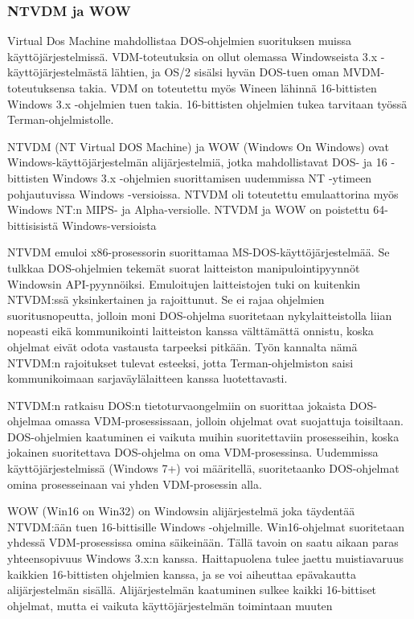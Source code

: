 \subsubsection{NTVDM ja WOW}
Virtual Dos Machine mahdollistaa DOS-ohjelmien suorituksen muissa käyttöjärjestelmissä. VDM-toteutuksia on ollut olemassa Windowseista 3.x -käyttöjärjestelmästä lähtien, ja OS/2 sisälsi hyvän DOS-tuen oman MVDM-toteutuksensa takia. VDM on toteutettu myös Wineen lähinnä 16-bittisten Windows 3.x -ohjelmien tuen takia. 16-bittisten ohjelmien tukea tarvitaan työssä Terman-ohjelmistolle.

NTVDM (NT Virtual DOS Machine) ja WOW (Windows On Windows) ovat Windows-käyttöjärjestelmän alijärjestelmiä, jotka mahdollistavat DOS- ja 16 -bittisten Windows 3.x -ohjelmien suorittamisen uudemmissa NT -ytimeen pohjautuvissa Windows -versioissa. NTVDM oli toteutettu emulaattorina myös Windows NT:n MIPS- ja Alpha-versiolle. NTVDM ja WOW on poistettu 64-bittisisistä Windows-versioista \citep{ntvdm_2}

NTVDM emuloi x86-prosessorin suorittamaa MS-DOS-käyttöjärjestelmää. Se tulkkaa DOS-ohjelmien tekemät suorat laitteiston manipulointipyynnöt Windowsin API-pyynnöiksi. Emuloitujen laitteistojen tuki on kuitenkin NTVDM:ssä yksinkertainen ja rajoittunut. Se ei rajaa ohjelmien suoritusnopeutta, jolloin moni DOS-ohjelma suoritetaan nykylaitteistolla liian nopeasti eikä kommunikointi laitteiston kanssa välttämättä onnistu, koska ohjelmat eivät odota vastausta tarpeeksi pitkään. Työn kannalta nämä NTVDM:n rajoitukset tulevat esteeksi, jotta Terman-ohjelmiston saisi kommunikoimaan sarjaväylälaitteen kanssa luotettavasti.

NTVDM:n ratkaisu DOS:n tietoturvaongelmiin on suorittaa jokaista DOS-ohjelmaa omassa VDM-prosessissaan, jolloin ohjelmat ovat suojattuja toisiltaan. DOS-ohjelmien kaatuminen ei vaikuta muihin suoritettaviin prosesseihin, koska jokainen suoritettava DOS-ohjelma on oma VDM-prosessinsa. Uudemmissa käyttöjärjestelmissä (Windows 7+) voi määritellä, suoritetaanko DOS-ohjelmat omina prosesseinaan vai yhden VDM-prosessin alla.

WOW (Win16 on Win32) on Windowsin alijärjestelmä joka täydentää NTVDM:ään tuen 16-bittisille Windows -ohjelmille. Win16-ohjelmat suoritetaan yhdessä VDM-prosessissa omina säikeinään. Tällä tavoin on saatu aikaan paras yhteensopivuus Windows 3.x:n kanssa. Haittapuolena tulee jaettu muistiavaruus kaikkien 16-bittisten ohjelmien kanssa, ja se voi aiheuttaa epävakautta alijärjestelmän sisällä. Alijärjestelmän kaatuminen sulkee kaikki 16-bittiset ohjelmat, mutta ei vaikuta käyttöjärjestelmän toimintaan muuten \citep{ntvdm_kb}


